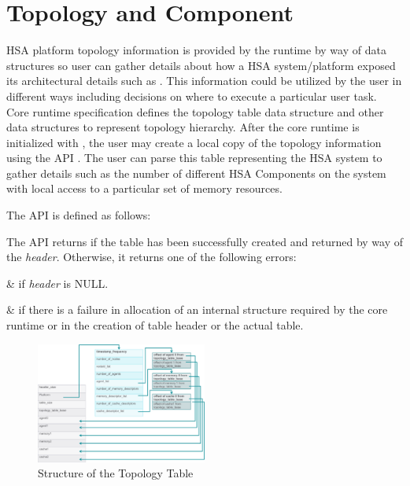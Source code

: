 \hypertarget{component}{}\section{Topology and Component
}\label{topology}
HSA platform topology information is provided by the runtime by way of
data structures so user can gather details about how a HSA
system/platform exposed its architectural details such as
\DIFdelbegin {}\DIFdelend \DIFaddbegin {}\DIFaddend . This information
could be utilized by the user in different ways including decisions
on where to execute a particular user task. Core runtime
specification defines the topology table data structure and other
data structures to represent topology hierarchy.  After the core
runtime is initialized with , the user may create a
local copy of the topology information using the API
. The user can parse this table
representing the HSA system to gather details such as the number of
different HSA Components on the system with local access to a
particular set of memory resources. \DIFaddbegin {}\DIFaddend 

The  API is defined as follows:



The API returns  if the table has been
successfully created and returned by way of the {\itshape header}. Otherwise,
it returns one of the following errors:

\begin{easylist}
&  if {\itshape header}
is NULL.

&  if there is a failure
in allocation of an internal structure required by the core runtime
or in the creation of table header or the actual table.
\end{easylist}

\begin{figure}
  \centering
  \includegraphics[width=0.5\textwidth]{topologytable}
  \centering
  \caption{Structure of the Topology Table}
  \label{fig:topology_table}
\end{figure}

